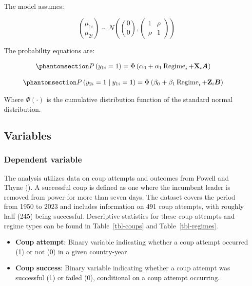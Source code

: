 \documentclass[
  12pt,
]{report}
\begin{document}
The model assumes:

\[
\binom{\mu_{1 i}}{\mu_{2 i}} \sim N\left(\binom{0}{0},\left(\begin{array}{ll}
1 & \rho \\
\rho & 1
\end{array}\right)\right)
\]

The probability equations are:

\begin{equation}\phantomsection\label{eq-eq7}{
\begin{aligned}
P\left(y_{1 i}=1\right) & =\Phi\left(\alpha_0+\alpha_1 \operatorname{Regime}_i+\mathbf{X}_i \boldsymbol{A}\right)
\end{aligned}
}\end{equation}

\begin{equation}\phantomsection\label{eq-eq8}{
\begin{aligned}
P\left(y_{2 i}=1 \mid y_{1 i}=1\right) & =\Phi\left(\beta_0+\beta_1 \operatorname{Regime}_i+\mathbf{Z}_i \boldsymbol{B}\right)
\end{aligned}
}\end{equation}

Where \(\Phi(\cdot)\) is the cumulative distribution function of the
standard normal distribution.

\subsection{Variables}\label{variables}

\subsubsection{Dependent variable}\label{dependent-variable}

The analysis utilizes data on coup attempts and outcomes from Powell and
Thyne (). A successful coup is defined as
one where the incumbent leader is removed from power for more than seven
days. The dataset covers the period from 1950 to 2023 and includes
information on 491 coup attempts, with roughly half (245) being
successful. Descriptive statistics for these coup attempts and regime
types can be found in Table~\ref{tbl-coups} and Table~\ref{tbl-regimes}.

\begin{itemize}
\item
  \textbf{Coup attempt}: Binary variable indicating whether a coup
  attempt occurred (1) or not (0) in a given country-year.
\item
  \textbf{Coup success}: Binary variable indicating whether a coup
  attempt was successful (1) or failed (0), conditional on a coup
  attempt occurring.
\end{itemize}
\end{document}
